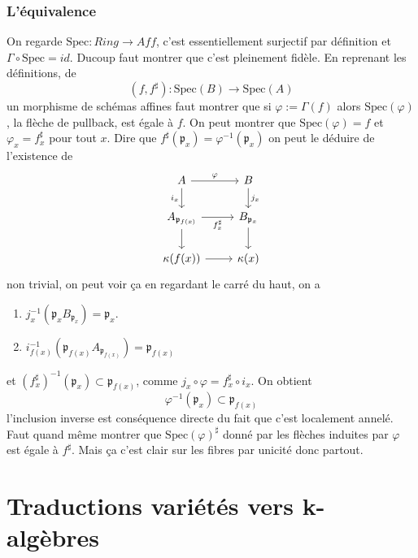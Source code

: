 \documentclass[a4paper,12pt]{book}
\newcommand{\Spec}{\textrm{Spec}}
\newcommand{\p}{\mathfrak{p}}
\theoremstyle{plain}
\theoremstyle{definition}
\theoremstyle{remark}
\begin{document}
\subsection{L'équivalence}
On regarde $\Spec\colon Ring\to Aff$, c'est essentiellement surjectif
par définition et $\Gamma\circ \Spec=id$. Ducoup faut montrer que c'est
pleinement fidèle. En reprenant les définitions, de 
\[(f,f^\sharp)\colon \Spec(B)\to \Spec(A)\]
un morphisme de schémas affines faut montrer que si $\varphi:=\Gamma(f)$
alors $\Spec(\varphi)$, la flèche de pullback, est égale à $f$. On peut 
montrer que $\Spec(\varphi)=f$ et $\varphi_x=f^\sharp_x$ pour tout $x$.
Dire que $f^\sharp(\p_x)=\varphi^{-1}(\p_x)$ on peut le déduire de 
l'existence de 
\[\begin{tikzcd}
	A & B \\
	{A_{\p_{f(x)}}} & {B_{\p_x}} \\
	{\kappa(f(x))} & {\kappa(x)}
	\arrow["\varphi", from=1-1, to=1-2]
	\arrow["{i_x}"', from=1-1, to=2-1]
	\arrow["{j_x}", from=1-2, to=2-2]
	\arrow["{f^\sharp_x}"', from=2-1, to=2-2]
	\arrow[from=2-1, to=3-1]
	\arrow[from=2-2, to=3-2]
	\arrow[from=3-1, to=3-2]
\end{tikzcd}\]
non trivial, on peut voir ça en regardant le carré du haut, on a 
\begin{enumerate}
    \item $j_x^{-1}(\p_xB_{\p_x})=\p_x$.
    \item $i_{f(x)}^{-1}(\p_{f(x)}A_{\p_{f(x)}})=\p_{f(x)}$
\end{enumerate}
et $(f^\sharp_x)^{-1}(\p_x)\subset \p_{f(x)}$, comme $j_x\circ\varphi=
f_x^\sharp\circ i_x$. On obtient 
\[\varphi^{-1}(\p_x)\subset \p_{f(x)}\]
l'inclusion inverse est conséquence directe du fait que c'est
localement annelé. Faut quand même montrer que $\Spec(\varphi)^\sharp$
donné par les flèches induites par $\varphi$ est égale à $f^\sharp$.
Mais ça c'est clair sur les fibres par unicité donc partout.






\chapter{Traductions variétés vers k-algèbres}
\end{document}
